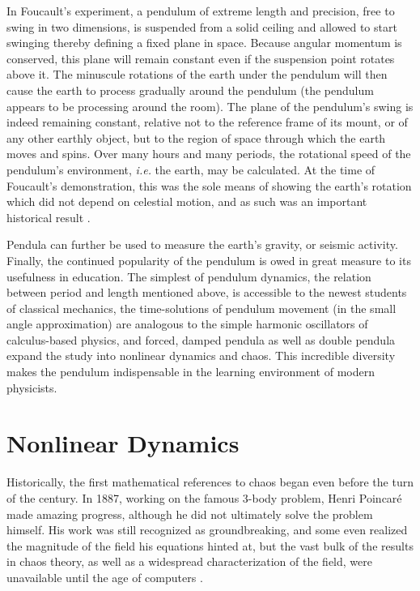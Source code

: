 \documentclass[12pt,twoside]{reedthesis}
\begin{document}
In Foucault's experiment, a pendulum of extreme length and precision, free to swing in two dimensions, is suspended from a solid ceiling and allowed to start swinging thereby defining a fixed plane in space.  Because angular momentum is conserved, this plane will remain constant even if the suspension point rotates above it.  The minuscule rotations of the earth under the pendulum will then cause the earth to process gradually around the pendulum (the pendulum appears to be processing around the room).  The plane of the pendulum's swing is indeed remaining constant, relative not to the reference frame of its mount, or of any other earthly object, but to the region of space through which the earth moves and spins.  Over many hours and many periods, the rotational speed of the pendulum's environment, \textit{i.e.} the earth, may be calculated.  At the time of Foucault's demonstration, this was the sole means of showing the earth's rotation which did not depend on celestial motion, and as such was an important historical result \cite{matthews2005}.   





Pendula can further be used to measure the earth's gravity, or seismic activity.   Finally, the continued popularity of the pendulum is owed in great measure to its usefulness in education.  The simplest of pendulum dynamics, the relation between period and length mentioned above, is accessible to the newest students of classical mechanics, the time-solutions of pendulum movement (in the small angle approximation) are analogous to the simple harmonic oscillators of calculus-based physics, and forced, damped pendula as well as double pendula expand the study into nonlinear dynamics and chaos.  This incredible diversity makes the pendulum indispensable in the learning environment of modern physicists.  


\section{Nonlinear Dynamics}
Historically, the first mathematical references to chaos began even before the turn of the century.  In 1887, working on the famous 3-body problem, Henri Poincar\'{e} made amazing progress, although he did not ultimately solve the problem himself.  His work was still recognized as groundbreaking, and some even realized the magnitude of the field his equations hinted at, but the vast bulk of the results in chaos theory, as well as a widespread characterization of the field, were unavailable until the age of computers \cite{poincare1890}.  
\end{document}
